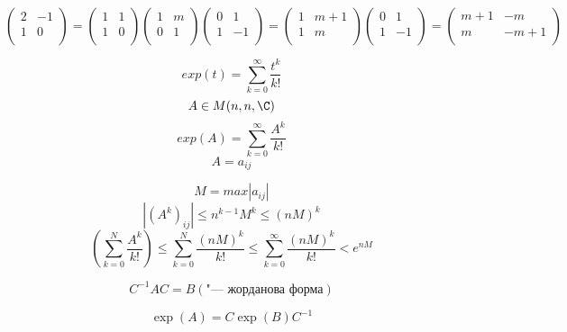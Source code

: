 \begin{enumerate}
$$
\begin{pmatrix}
2&-1\\
1&0\\
\end{pmatrix} = 
\begin{pmatrix}
1&1\\
1&0\\
\end{pmatrix} \begin{pmatrix}
1&m\\
0&1\\
\end{pmatrix} \begin{pmatrix}
0&1\\
1&-1\\
\end{pmatrix} = 
\begin{pmatrix}
1&m + 1\\
1&m\\
\end{pmatrix} \begin{pmatrix}
0&1\\
1&-1\\
\end{pmatrix} = 
\begin{pmatrix}
m + 1& -m\\
m& -m + 1\\
\end{pmatrix}
$$

$$exp(t) = \sum_{k = 0}^{\infty}\frac{t^k}{k!}$$ 
$$A \in M(n, n, \C)$$
$$exp(A) = \sum_{k = 0}^{\infty}\frac{A^k}{k!}$$
$$A = a_{ij} $$

$$M = max|a_{ij}|$$
$$|(A^k)_{ij}| \le n^{k - 1}M^{k} \le (nM)^k$$
$$(\sum_{k = 0}^{N}\frac{A^k}{k!}) \le \sum_{k = 0}^{N}\frac{(nM)^k}{k!} \le
\sum_{k = 0}^{\infty}\frac{(nM)^k}{k!} < e^{nM}$$

$$C^{-1}AC = B(\text{"--- жорданова форма})$$

$$\exp(A) = C \exp(B)C^{-1}$$

\end{enumerate}
                  
